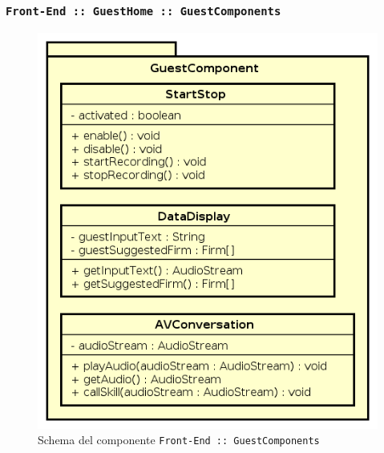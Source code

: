 \documentclass[../DefinizioneDiProdotto.tex]{subfiles}
\begin{document}
	\subsubsection{ \texttt{Front-End :: GuestHome :: GuestComponents}}
	\begin{figure}[!h]
		\centering
		\includegraphics[scale=0.7]{Architettura/Front-End/GuestHome/GuestComponents.png}
		\caption{Schema del componente \texttt{Front-End :: GuestComponents}}
	\end{figure}
\end{document}

